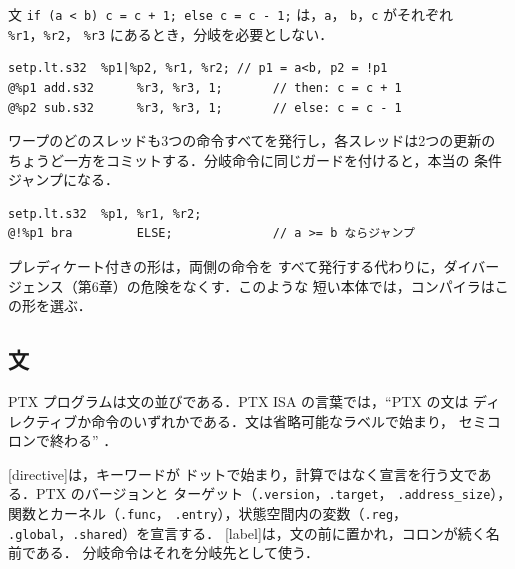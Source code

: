 \documentclass[../main.tex]{subfiles}
\begin{document}
\begin{example}[プレディケートによる分岐の除去]
  \label{ex:l10-predication}
  文 \texttt{if (a < b) c = c + 1; else c = c - 1;} は，\texttt{a}，
  \texttt{b}，\texttt{c} がそれぞれ \texttt{\%r1}，\texttt{\%r2}，
  \texttt{\%r3} にあるとき，分岐を必要としない．
\begin{lstlisting}[language=PTX, numbers=none]
     setp.lt.s32  %p1|%p2, %r1, %r2; // p1 = a<b, p2 = !p1
@%p1 add.s32      %r3, %r3, 1;       // then: c = c + 1
@%p2 sub.s32      %r3, %r3, 1;       // else: c = c - 1
\end{lstlisting}
  ワープのどのスレッドも3つの命令すべてを発行し，各スレッドは2つの更新の
  ちょうど一方をコミットする．分岐命令に同じガードを付けると，本当の
  条件ジャンプになる．
\begin{lstlisting}[language=PTX, numbers=none]
     setp.lt.s32  %p1, %r1, %r2;
@!%p1 bra         ELSE;              // a >= b ならジャンプ
\end{lstlisting}
\end{example}

プレディケート付きの形は，両側の命令を
すべて発行する代わりに，ダイバージェンス（第6章）の危険をなくす．このような
短い本体では，コンパイラはこの形を選ぶ．

\subsection{文}

PTX プログラムは文の並びである．PTX ISA の言葉では，\enquote{PTX の文は
ディレクティブか命令のいずれかである．文は省略可能なラベルで始まり，
セミコロンで終わる} \cite[§4.3]{nvidia2026ptx}．

\begin{definition}
  [directive]は，キーワードが
  ドットで始まり，計算ではなく宣言を行う文である．PTX のバージョンと
  ターゲット（\texttt{.version}，\texttt{.target}，
  \texttt{.address\_size}），関数とカーネル（\texttt{.func}，
  \texttt{.entry}），状態空間内の変数（\texttt{.reg}，
  \texttt{.global}，\texttt{.shared}）を宣言する．
  [label]は，文の前に置かれ，コロンが続く名前である．
  分岐命令はそれを分岐先として使う．
\end{definition}
\end{document}

